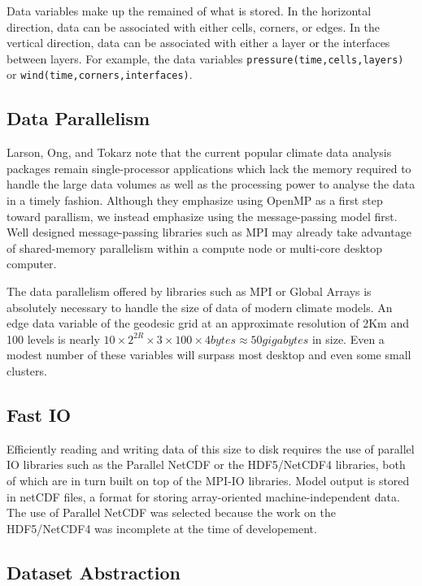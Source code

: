 Data variables make up the remained of what is stored.  In the horizontal
direction, data can be associated with either cells, corners, or edges.  In
the vertical direction, data can be associated with either a layer or the
interfaces between layers.  For example, the data variables
\verb+pressure(time,cells,layers)+ or \verb+wind(time,corners,interfaces)+.

\subsection{Data Parallelism}

Larson, Ong, and Tokarz note that the current popular climate data analysis
packages remain single-processor applications which lack the memory required
to handle the large data volumes as well as the processing power to analyse
the data in a timely fashion.\cite{MODSIM07:LOT}  Although they emphasize
using OpenMP as a first step toward parallism, we instead emphasize using the
message-passing model first.  Well designed message-passing libraries such as
MPI may already take advantage of shared-memory parallelism within a compute
node or multi-core desktop computer.

The data parallelism offered by libraries such as MPI or Global Arrays is
absolutely necessary to handle the size of data of modern climate models.  An
edge data variable of the geodesic grid at an approximate resolution of 2Km
and 100 levels is nearly $10 \times 2^{2R} \times 3 \times 100 \times 4
\unit{bytes} \approx 50 \unit{gigabytes}$ in size.  Even a modest number of
these variables will surpass most desktop and even some small clusters.

\subsection{Fast IO}

Efficiently reading and writing data of this size to disk requires the use of
parallel IO libraries such as the Parallel NetCDF\cite{PNETCDF} or the
HDF5/NetCDF4\cite{HDF5}\cite{NETCDF} libraries, both of which are in turn
built on top of the MPI-IO libraries\cite{MPIIO}.  Model output is stored in
netCDF\cite{NETCDF} files, a format for storing array-oriented
machine-independent data.  The use of Parallel NetCDF was selected because the
work on the HDF5/NetCDF4 was incomplete at the time of developement.

\subsection{Dataset Abstraction}

